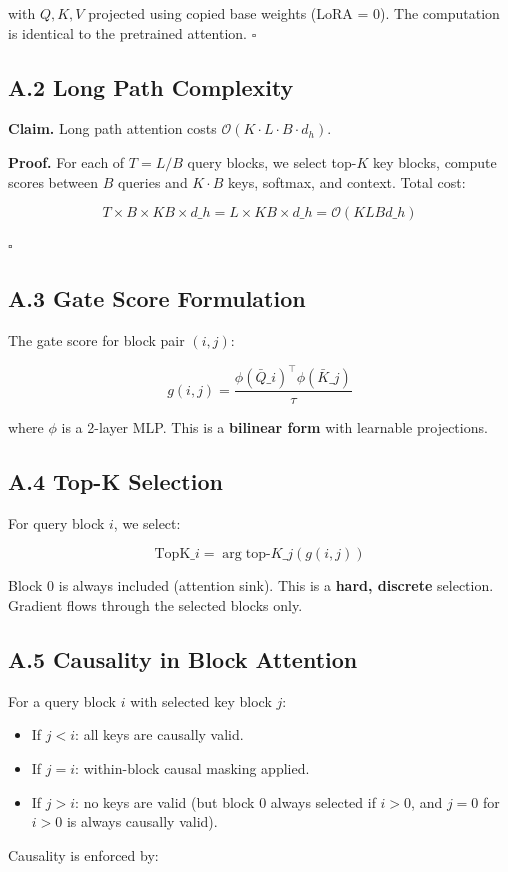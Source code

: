with $Q, K, V$ projected using copied base weights (LoRA = 0). The 
computation is identical to the pretrained attention. $\square$

\subsection{A.2 Long Path Complexity}

\textbf{Claim.} Long path attention costs $\mathcal{O}(K \cdot L \cdot B \cdot d_h)$.

\textbf{Proof.} For each of $T = L/B$ query blocks, we select top-$K$ key 
blocks, compute scores between $B$ queries and $K \cdot B$ keys, softmax, 
and context. Total cost:

\[
T \times B \times K B \times d\_h = L \times K B \times d\_h = \mathcal{O}(K L B d\_h)
\tag{A.2}
\]

$\square$

\subsection{A.3 Gate Score Formulation}

The gate score for block pair $(i, j)$:

\[
g(i, j) = \frac{\phi(\bar{Q}\_i)^\top \phi(\bar{K}\_j)}{\tau}
\tag{A.3}
\]

where $\phi$ is a 2-layer MLP. This is a \textbf{bilinear form} with learnable 
projections.

\subsection{A.4 Top-K Selection}

For query block $i$, we select:

\[
\text{TopK}\_i = \arg\text{top-}K\_j (g(i, j))
\tag{A.4}
\]

Block 0 is always included (attention sink). This is a \textbf{hard, discrete} 
selection. Gradient flows through the selected blocks only.

\subsection{A.5 Causality in Block Attention}

For a query block $i$ with selected key block $j$:

\begin{itemize}
\item If $j < i$: all keys are causally valid.
\item If $j = i$: within-block causal masking applied.
\item If $j > i$: no keys are valid (but block 0 always selected if $i > 0$,
  and $j = 0$ for $i > 0$ is always causally valid).

\end{itemize}
Causality is enforced by:

